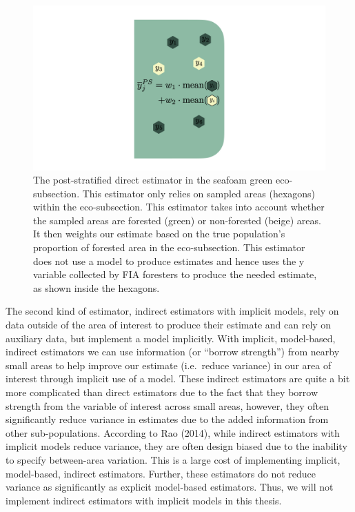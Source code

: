 \documentclass[12pt,twoside]{reedthesis}
\begin{document}
\begin{figure}

{\centering \includegraphics[width=1\linewidth]{figure/ps-diagram} 

}

\caption[The post-stratified direct estimator]{The post-stratified direct estimator in the seafoam green eco-subsection. This estimator only relies on sampled areas (hexagons) within the eco-subsection. This estimator takes into account whether the sampled areas are forested (green) or non-forested (beige) areas. It then weights our estimate based on the true population's proportion of forested area in the eco-subsection. This estimator does not use a model to produce estimates and hence uses the y variable collected by FIA foresters to produce the needed estimate, as shown inside the hexagons.}\label{fig:ps-diagram}
\end{figure}
The second kind of estimator, indirect estimators with implicit models, rely on data outside of the area of interest to produce their estimate and can rely on auxiliary data, but implement a model implicitly. With implicit, model-based, indirect estimators we can use information (or ``borrow strength'') from nearby small areas to help improve our estimate (i.e.~reduce variance) in our area of interest through implicit use of a model. These indirect estimators are quite a bit more complicated than direct estimators due to the fact that they borrow strength from the variable of interest across small areas, however, they often significantly reduce variance in estimates due to the added information from other sub-populations. According to Rao (2014), while indirect estimators with implicit models reduce variance, they are often design biased due to the inability to specify between-area variation. This is a large cost of implementing implicit, model-based, indirect estimators. Further, these estimators do not reduce variance as significantly as explicit model-based estimators. Thus, we will not implement indirect estimators with implicit models in this thesis.
\end{document}
